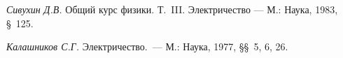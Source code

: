 \begin{lab:literature}
	\item {\em Сивухин Д.В.} Общий курс физики. Т.~III. Электричество --- М.:
Наука, 1983, \S~125.

	\item {\em Калашников С.Г.} Электричество.~--- М.: Наука, 1977, \S\S~5, 6,
26.

\end{lab:literature}

